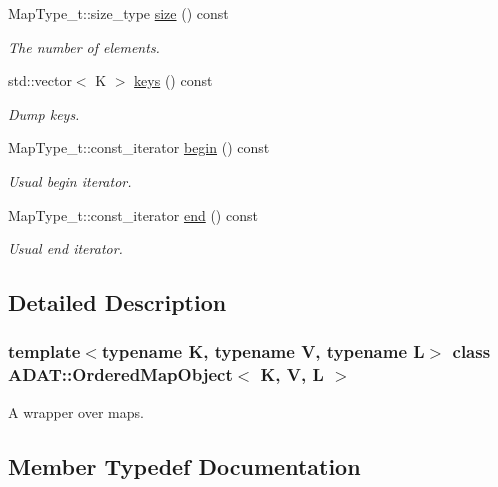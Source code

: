 \begin{DoxyCompactItemize}
Map\+Type\+\_\+t\+::size\+\_\+type \mbox{\hyperlink{classADAT_1_1OrderedMapObject_a3d96d76de0ad61fb858509543c3f60f4}{size}} () const
\begin{DoxyCompactList}\small\item\em The number of elements. \end{DoxyCompactList}\item 
std\+::vector$<$ K $>$ \mbox{\hyperlink{classADAT_1_1OrderedMapObject_ad376a69c5761afe8fe44d3a24c44ba4c}{keys}} () const
\begin{DoxyCompactList}\small\item\em Dump keys. \end{DoxyCompactList}\item 
Map\+Type\+\_\+t\+::const\+\_\+iterator \mbox{\hyperlink{classADAT_1_1OrderedMapObject_afe44774d4a446c8f66ea5d6bd2c5d59f}{begin}} () const
\begin{DoxyCompactList}\small\item\em Usual begin iterator. \end{DoxyCompactList}\item 
Map\+Type\+\_\+t\+::const\+\_\+iterator \mbox{\hyperlink{classADAT_1_1OrderedMapObject_ae6ad157b81bdf303beaee4422f313ed4}{end}} () const
\begin{DoxyCompactList}\small\item\em Usual end iterator. \end{DoxyCompactList}\end{DoxyCompactItemize}


\subsection{Detailed Description}
\subsubsection*{template$<$typename K, typename V, typename L$>$\newline
class A\+D\+A\+T\+::\+Ordered\+Map\+Object$<$ K, V, L $>$}

A wrapper over maps. 

\subsection{Member Typedef Documentation}
\mbox{\label{classADAT_1_1OrderedMapObject_a4341262d590e4628319a61210534ab88}} 
